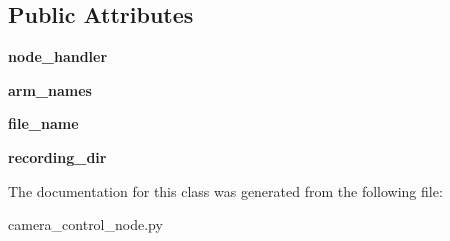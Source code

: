 \subsection*{Public Attributes}
\begin{DoxyCompactItemize}
\item 
\hypertarget{classcamera__control__node_1_1camera__qt__gui_1_1thread__bag__writer_a1afa2b041166ee4e7de1c328c085dcf9}{{\bfseries node\-\_\-handler}}\label{classcamera__control__node_1_1camera__qt__gui_1_1thread__bag__writer_a1afa2b041166ee4e7de1c328c085dcf9}

\item 
\hypertarget{classcamera__control__node_1_1camera__qt__gui_1_1thread__bag__writer_adee95e934075939075c876e241fc8d3f}{{\bfseries arm\-\_\-names}}\label{classcamera__control__node_1_1camera__qt__gui_1_1thread__bag__writer_adee95e934075939075c876e241fc8d3f}

\item 
\hypertarget{classcamera__control__node_1_1camera__qt__gui_1_1thread__bag__writer_a75eb69ef18c557625997e0aca6ee0fc4}{{\bfseries file\-\_\-name}}\label{classcamera__control__node_1_1camera__qt__gui_1_1thread__bag__writer_a75eb69ef18c557625997e0aca6ee0fc4}

\item 
\hypertarget{classcamera__control__node_1_1camera__qt__gui_1_1thread__bag__writer_ad5ab337027f24baa9b6834558ca1fa7e}{{\bfseries recording\-\_\-dir}}\label{classcamera__control__node_1_1camera__qt__gui_1_1thread__bag__writer_ad5ab337027f24baa9b6834558ca1fa7e}

\end{DoxyCompactItemize}


The documentation for this class was generated from the following file\-:\begin{DoxyCompactItemize}
\item 
camera\-\_\-control\-\_\-node.\-py\end{DoxyCompactItemize}
